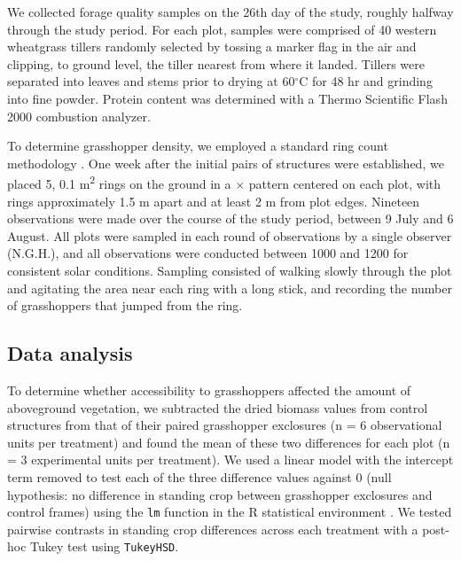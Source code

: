 \documentclass[referee, 
	            sn-basic]
           {sn-jnl}
\begin{document}
\begin{linenumbers}

We collected forage quality samples on the 26th day of the study, roughly halfway through the study period.
For each plot, samples were comprised of 40 western wheatgrass tillers randomly selected by tossing a marker flag in the air and clipping, to ground level, the tiller nearest from where it landed. 
Tillers were  separated into leaves and stems prior to drying at 60$^\circ$C for 48 hr and grinding into fine powder. 
Protein content was determined with a Thermo Scientific Flash 2000 combustion analyzer. 

To determine grasshopper density, we employed a standard ring count methodology
\citep{onsager1977, joern2013}. 
One week after the initial pairs of structures were established, we placed 5, 0.1 m\textsuperscript{2} rings on the ground in a {\large{$\times$}} pattern centered on each plot, with rings approximately 1.5 m apart and at least 2 m from plot edges.
Nineteen observations were made over the course of the study period, between 9 July and 6 August. 
All plots were sampled in each round of observations by a single observer (N.G.H.), and all observations were conducted between 1000 and 1200 for consistent solar conditions. 
Sampling consisted of walking slowly through the plot and agitating the area near each ring with a long stick, and recording the number of grasshoppers that jumped from the ring.

\subsection{Data analysis}

To determine whether accessibility to grasshoppers affected the amount of aboveground vegetation, we subtracted the dried biomass values from control structures from that of their paired grasshopper exclosures (n = 6 observational units per treatment) and found the mean of these two differences for each plot (n = 3 experimental units per treatment). 
We used a linear model with the intercept term removed to test each of the three difference values against 0 (null hypothesis: no difference in standing crop between grasshopper exclosures and control frames) using the \texttt{lm} function in the \textsf{R} statistical environment \citep{Rcore2020}. 
We tested pairwise contrasts in standing crop differences across each treatment with a post-hoc Tukey test using \texttt{TukeyHSD}.


\end{linenumbers}
\end{document}

